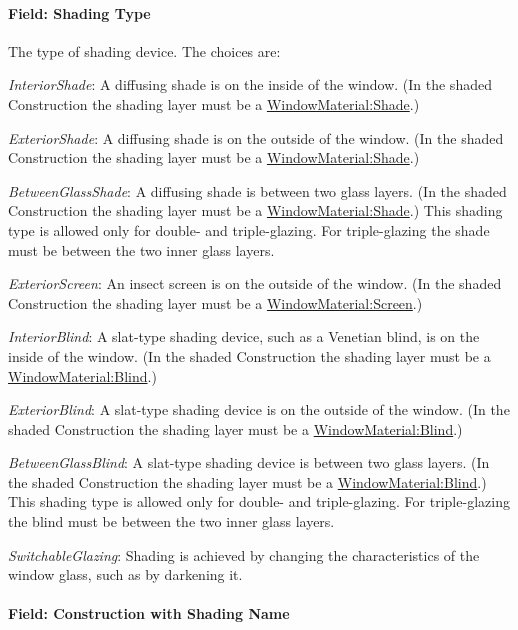 \paragraph{Field: Shading Type}\label{field-shading-type}

The type of shading device. The choices are:

\emph{InteriorShade}: A diffusing shade is on the inside of the window. (In the shaded Construction the shading layer must be a \hyperref[windowmaterialshade]{WindowMaterial:Shade}.)

\emph{ExteriorShade}: A diffusing shade is on the outside of the window. (In the shaded Construction the shading layer must be a \hyperref[windowmaterialshade]{WindowMaterial:Shade}.)

\emph{BetweenGlassShade}: A diffusing shade is between two glass layers. (In the shaded Construction the shading layer must be a \hyperref[windowmaterialshade]{WindowMaterial:Shade}.) This shading type is allowed only for double- and triple-glazing. For triple-glazing the shade must be between the two inner glass layers.

\emph{ExteriorScreen}: An insect screen is on the outside of the window. (In the shaded Construction the shading layer must be a \hyperref[windowmaterialscreen]{WindowMaterial:Screen}.)

\emph{InteriorBlind}: A slat-type shading device, such as a Venetian blind, is on the inside of the window. (In the shaded Construction the shading layer must be a \hyperref[windowmaterialblind]{WindowMaterial:Blind}.)

\emph{ExteriorBlind}: A slat-type shading device is on the outside of the window. (In the shaded Construction the shading layer must be a \hyperref[windowmaterialblind]{WindowMaterial:Blind}.)

\emph{BetweenGlassBlind}: A slat-type shading device is between two glass layers. (In the shaded Construction the shading layer must be a \hyperref[windowmaterialblind]{WindowMaterial:Blind}.) This shading type is allowed only for double- and triple-glazing. For triple-glazing the blind must be between the two inner glass layers.

\emph{SwitchableGlazing}: Shading is achieved by changing the characteristics of the window glass, such as by darkening it.

\paragraph{Field: Construction with Shading Name}\label{field-construction-with-shading-name}

